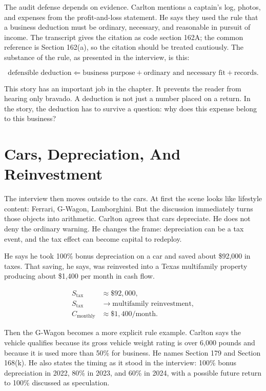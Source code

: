 The audit defense depends on evidence. Carlton mentions a captain's log, photos, and expenses from the profit-and-loss statement. He says they used the rule that a business deduction must be ordinary, necessary, and reasonable in pursuit of income. The transcript gives the citation as code section 162A; the common reference is Section 162(a), so the citation should be treated cautiously. The substance of the rule, as presented in the interview, is this:

\begin{equation}
\text{defensible deduction}
\Longleftarrow
\text{business purpose}
+
\text{ordinary and necessary fit}
+
\text{records}.
\end{equation}

This story has an important job in the chapter. It prevents the reader from hearing only bravado. A deduction is not just a number placed on a return. In the story, the deduction has to survive a question: why does this expense belong to this business?

\section{Cars, Depreciation, And Reinvestment}

The interview then moves outside to the cars. At first the scene looks like lifestyle content: Ferrari, G-Wagon, Lamborghini. But the discussion immediately turns those objects into arithmetic. Carlton agrees that cars depreciate. He does not deny the ordinary warning. He changes the frame: depreciation can be a tax event, and the tax effect can become capital to redeploy.

He says he took 100\% bonus depreciation on a car and saved about \$92,000 in taxes. That saving, he says, was reinvested into a Texas multifamily property producing about \$1,400 per month in cash flow.

\begin{align}
S_{\mathrm{tax}} &\approx \$92{,}000,\\
S_{\mathrm{tax}} &\longrightarrow \text{multifamily reinvestment},\\
C_{\mathrm{monthly}} &\approx \$1{,}400/\text{month}.
\end{align}

Then the G-Wagon becomes a more explicit rule example. Carlton says the vehicle qualifies because its gross vehicle weight rating is over 6,000 pounds and because it is used more than 50\% for business. He names Section 179 and Section 168(k). He also states the timing as it stood in the interview: 100\% bonus depreciation in 2022, 80\% in 2023, and 60\% in 2024, with a possible future return to 100\% discussed as speculation.

